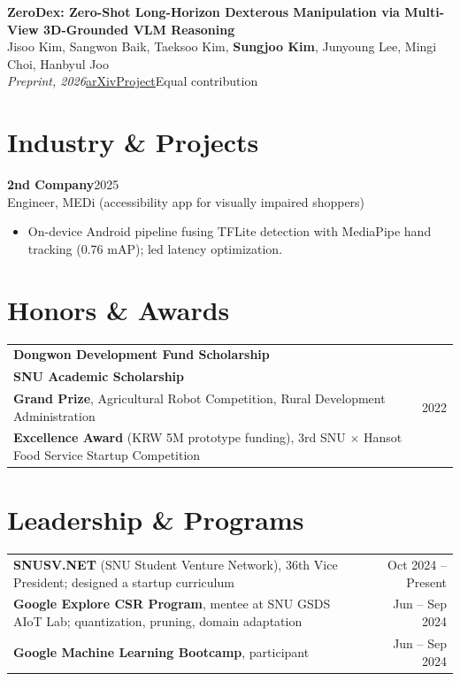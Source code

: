 \documentclass[10pt,a4paper]{article}
\newcommand{\entry}[3]{%
  {\textbf{#1}\hfill{\color{muted}\small #2}}\\
  {\color{muted}#3}\par}
\newcommand{\pub}[4]{%
  \textbf{#1}\\
  {\small #2}\\
  {\small\color{muted}\textit{#3}\quad #4}\par}
\newcommand{\me}{\textbf{Sungjoo Kim}}
\newcommand{\sep}{\enspace{\color{rule}|}\enspace}
\begin{document}
\pub{ZeroDex: Zero-Shot Long-Horizon Dexterous Manipulation via Multi-View 3D-Grounded VLM Reasoning}
    {Jisoo Kim, Sangwon Baik, Taeksoo Kim, \me, Junyoung Lee, Mingi Choi, Hanbyul Joo}
    {Preprint, 2026}
    {\href{https://arxiv.org/abs/2606.19340}{arXiv}\sep\href{https://jlogkim.github.io/zerodex/}{Project}\hfill * Equal contribution}

\section{Industry \& Projects}

\entry{2nd Company}{2025}
      {Engineer, MEDi (accessibility app for visually impaired shoppers)}
\begin{itemize}
  \item On-device Android pipeline fusing TFLite detection with MediaPipe hand tracking (0.76 mAP); led latency optimization.
\end{itemize}

\section{Honors \& Awards}

\begin{tabularx}{\linewidth}{@{}X r@{}}
  \textbf{Dongwon Development Fund Scholarship} & {\color{muted}\small } \\[2pt]
  \textbf{SNU Academic Scholarship} & {\color{muted}\small } \\[2pt]
  \textbf{Grand Prize}, Agricultural Robot Competition, Rural Development Administration & {\color{muted}\small 2022} \\[2pt]
  \textbf{Excellence Award} (KRW 5M prototype funding), 3rd SNU $\times$ Hansot Food Service Startup Competition & {\color{muted}\small } \\
\end{tabularx}

\section{Leadership \& Programs}

\begin{tabularx}{\linewidth}{@{}X r@{}}
  \textbf{SNUSV.NET} (SNU Student Venture Network), 36th Vice President; designed a startup curriculum & {\color{muted}\small Oct 2024 -- Present} \\[2pt]
  \textbf{Google Explore CSR Program}, mentee at SNU GSDS AIoT Lab; quantization, pruning, domain adaptation & {\color{muted}\small Jun -- Sep 2024} \\[2pt]
  \textbf{Google Machine Learning Bootcamp}, participant & {\color{muted}\small Jun -- Sep 2024} \\
\end{tabularx}
\end{document}
